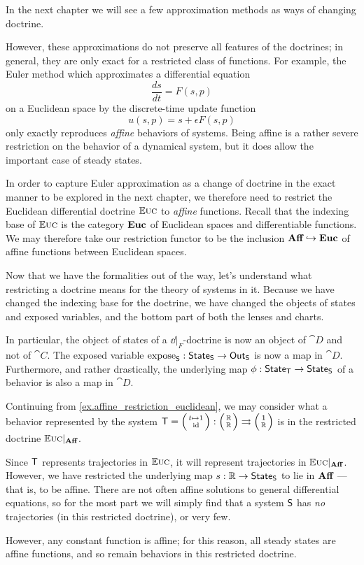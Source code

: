 \documentclass[DynamicalBook]{subfiles}
\begin{document}
\begin{example}\label{ex.affine_restriction_euclidean}
In the next chapter we will see a few approximation methods as ways of changing
doctrine. 

 However, these approximations do not preserve all features of the
doctrines; in general, they are only exact for a restricted class of functions. For example, the Euler method which approximates a differential
equation
$$\frac{ds}{dt} = F(s, p)$$
on a Euclidean space by the discrete-time update function 
$$u(s, p) = s + \epsilon F(s, p)$$
only exactly reproduces \emph{affine} behaviors of systems. Being affine is a
rather severe restriction on the behavior of a dynamical system, but it does
allow the important case of steady states.

In order to capture Euler approximation as a change of doctrine in the exact
manner to be explored in the next chapter, we therefore need to restrict the
Euclidean differential doctrine $\mathbb{E}\textsc{uc}$ to \emph{affine} functions. Recall
that the indexing base of $\mathbb{E}\textsc{uc}$ is the category $\textbf{Euc}$ of Euclidean
spaces and differentiable functions. We may therefore take our restriction functor to be
the inclusion $\textbf{Aff} \hookrightarrow \textbf{Euc}$ of affine functions between
Euclidean spaces.
\end{example}

Now that we have the formalities out of the way, let's understand what
restricting a doctrine means for the theory of systems in it. Because we have
changed the indexing base for the doctrine, we have changed the objects of
states and exposed variables, and the bottom part of both the lenses and charts. 

In particular, the object of states of a $\dd|_F$-doctrine is now an object of
$\cat{D}$ and not of $\cat{C}$. The exposed variable $\mathrm{expose}_{\mathsf{S}} : \mathsf{State}_{\mathsf{S}} \to
\mathsf{Out}_{\mathsf{S}}$ is now a map in $\cat{D}$. Furthermore, and rather drastically, the underlying map $\phi :
\mathsf{State}_{\mathsf{T}} \to \mathsf{State}_{\mathsf{S}}$ of a behavior is also a map in $\cat{D}$.

\begin{example}
Continuing from \cref{ex.affine_restriction_euclidean}, we may consider what a
behavior represented by the system $\Sys{T} = \lens{t \mapsto 1}{\id} : \lens{\rr}{\rr} \tto
\lens{\ord{1}}{\rr}$ is in the restricted doctrine $\mathbb{E}\textsc{uc}|_{\textbf{Aff}}$.

Since $\mathsf{T}$ represents trajectories in $\mathbb{E}\textsc{uc}$, it will represent
trajectories in $\mathbb{E}\textsc{uc}|_{\textbf{Aff}}$. However, we have restricted the
underlying map $s : \mathbb{R} \to \mathsf{State}_{\mathsf{S}}$ to lie in $\textbf{Aff}$ --- that is, to be
affine. There are not often affine solutions to general differential equations,
so for the most part we will simply find that a system $\mathsf{S}$ has \emph{no}
trajectories (in this restricted doctrine), or very few.

However, any constant function is affine; for this reason, all steady states are
affine functions, and so remain behaviors in this restricted doctrine.
\end{example}
\end{document}
